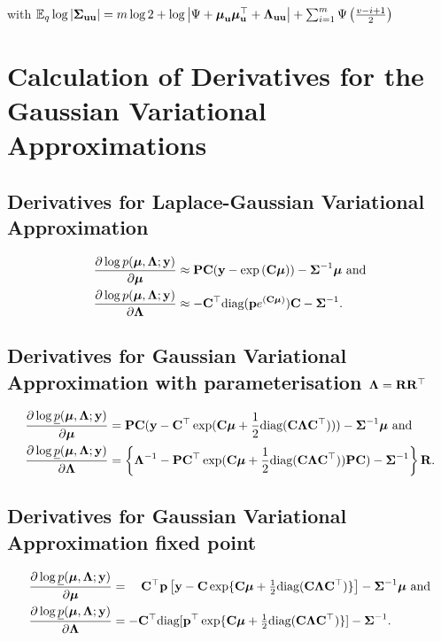 \noindent with ${\mathbb E}_q \log |{\boldsymbol \Sigma}_{{\bf u} {\bf u}}| = m \log 2 + \log \left | \Psi + {\boldsymbol \mu}_{\bf u} {\boldsymbol \mu}_{\bf u}^\top + {\boldsymbol \Lambda}_{{\bf u} {\bf u}} \right | + \sum_{i=1}^m \Psi \left ( \frac{v - i + 1}{2} \right )$

\section{Calculation of Derivatives for the Gaussian Variational Approximations}
\subsection{Derivatives for Laplace-Gaussian Variational Approximation}
\label{sec:appendix_derivatives_laplace}
\begin{align*}
	\frac{\partial \log p({\boldsymbol \mu}, {\boldsymbol \Lambda}; {\bf y})}{\partial {\boldsymbol\mu}}     & \approx {\bf P} {\bf C} ({\bf y} - \exp{({\bf C}{\boldsymbol\mu})}) - {\boldsymbol \Sigma}^{-1} {\boldsymbol \mu} \text{ and} \\
	\frac{\partial \log p({\boldsymbol \mu}, {\boldsymbol \Lambda}; {\bf y})}{\partial {\boldsymbol\Lambda}} & \approx - {\bf C}^\top \text{diag}({\bf p} e^{({\bf C} {\boldsymbol \mu})}) {\bf C} - {\boldsymbol \Sigma}^{-1}.   
\end{align*}
		
\subsection{Derivatives for Gaussian Variational Approximation with parameterisation ${\boldsymbol \Lambda} = {\bf R} {\bf R}^\top$}
\label{sec:appendix_derivatives_gva}
\begin{align*}
	\frac{\partial \log \underline{p}({\boldsymbol \mu}, {\boldsymbol \Lambda}; {\bf y})}{\partial {\boldsymbol\mu}}     & = {\bf P} {\bf C} ({\bf y} - {\bf C}^\top \exp({\bf C} {\boldsymbol \mu} + \frac{1}{2} \text{diag}{({\bf C}{\boldsymbol\Lambda}{\bf C}^\top)})) - {\boldsymbol \Sigma}^{-1} {\boldsymbol \mu} \text{ and}                \\
	\frac{\partial \log \underline{p}({\boldsymbol \mu}, {\boldsymbol \Lambda}; {\bf y})}{\partial {\boldsymbol\Lambda}} & = \left \{{\boldsymbol \Lambda}^{-1} - {\bf P} {\bf C}^\top \exp({\bf C} {\boldsymbol \mu} + \frac{1}{2} \text{diag}({\bf C} {\boldsymbol \Lambda} {\bf C}^\top)) {\bf P} {\bf C}) - {\boldsymbol \Sigma}^{-1} \right \} {\bf R}. 
\end{align*}

\subsection{Derivatives for Gaussian Variational Approximation fixed point}
\label{sec:appendix_derivatives_gva_fixed_point}
\begin{align*}
	\frac{\partial \log \underline{p}({\boldsymbol \mu}, {\boldsymbol \Lambda}; {\bf y})}{\partial {\boldsymbol\mu}}     & = \quad {\bf C}^\top{\bf p} \left [{\bf y} - {\bf C}\exp\{{\bf C} {\boldsymbol \mu} + \tfrac{1}{2} \text{diag}({\bf C} {\boldsymbol \Lambda} {\bf C}^\top)\} \right ] - {\boldsymbol \Sigma}^{-1} {\boldsymbol \mu} \text{ and} \\
	\frac{\partial \log \underline{p}({\boldsymbol \mu}, {\boldsymbol \Lambda}; {\bf y})}{\partial {\boldsymbol\Lambda}} & = -{\bf C}^\top \text{diag}[{\bf p}^\top \exp\{{\bf C} {\boldsymbol \mu} +\tfrac{1}{2} \text{diag}({\bf C} {\boldsymbol \Lambda} {\bf C}^\top)\}] - {\boldsymbol \Sigma}^{-1}.                             
\end{align*}
